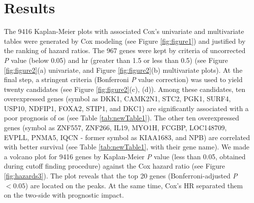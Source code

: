 \documentclass[jpm,article,submit,moreauthors,pdftex]{Definitions/mdpi}
\begin{document}

\clearpage

\section{Results}


The 9416 Kaplan-Meier plots with associated Cox's univariate and multivariate tables were generated by Cox modeling (see Figure \ref{fig:figure1}) and justified by the ranking of hazard ratios.
The 967 genes were kept by criteria of uncorrected \textit{P} value (below 0.05) and \acrfull{hr} (greater than 1.5 or less than 0.5) (see Figure \ref{fig:figure2}(a) univariate, and Figure \ref{fig:figure2}(b) multivariate plots). 
At the final step, a stringent criteria (Bonferroni \textit{P} value correction) was used to yield twenty candidates (see Figure \ref{fig:figure2}(c), (d)). 
Among these candidates, ten overexpressed genes (symbol as DKK1, CAMK2N1, STC2, PGK1, SURF4, USP10, NDFIP1, FOXA2, STIP1, and DKC1) are significantly associated with a poor prognosis of  \acrshort{os} (see Table \ref{tab:newTable1}). 
The other ten overexpressed genes (symbol as ZNF557, ZNF266, IL19, MYO1H, FCGBP, LOC148709, EVPLL, PNMA5, IQCN - former symbol as KIAA1683, and NPB) are correlated with better survival (see Table \ref{tab:newTable1}, with their gene name).
We made a volcano plot for 9416 genes by Kaplan-Meier \textit{P} value (less than 0.05, obtained during cutoff finding procedure) against the Cox hazard ratio (see Figure \ref{fig:hazards3}). %
The plot reveals that the top 20 genes (Bonferroni-adjusted \textit{P} $< 0.05$) are located on the peaks. At the same time, Cox's HR separated them on the two-side with prognostic impact.
\end{document}
